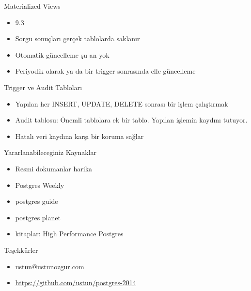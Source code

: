 \documentclass[presentation]{beamer}
\begin{document}
\begin{frame}[label=sec-36]{Materialized Views}
\begin{itemize}
\item 9.3
\item Sorgu sonuçları gerçek tablolarda saklanır
\item Otomatik güncelleme şu an yok
\item Periyodik olarak ya da bir trigger sonrasında elle güncelleme
\end{itemize}
\end{frame}

\begin{frame}[label=sec-37]{Trigger ve Audit Tabloları}
\begin{itemize}
\item Yapılan her INSERT, UPDATE, DELETE sonrası bir işlem çalıştırmak
\item Audit tablosu: Önemli tablolara ek bir tablo. Yapılan işlemin kaydını
tutuyor.
\item Hatalı veri kaydına karşı bir koruma sağlar
\end{itemize}
\end{frame}

\begin{frame}[label=sec-38]{Yararlanabileceginiz Kaynaklar}
\begin{itemize}
\item Resmi dokumanlar harika
\item Postgres Weekly
\item postgres guide
\item postgres planet
\item kitaplar: High Performance Postgres
\end{itemize}
\end{frame}


\begin{frame}[label=sec-39]{Teşekkürler}
\begin{itemize}
\item ustun@ustunozgur.com
\item \url{https://github.com/ustun/postgres-2014}
\end{itemize}
\end{frame}
\end{document}
